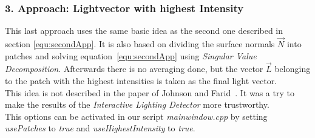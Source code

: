 \subsubsection{3. Approach: Lightvector with highest Intensity}\label{sec:appThree}
This last approach uses the same basic idea as the second one described in section \ref{equ:secondApp}. It is also based on dividing the surface normals $\vec{N}$ into patches and solving equation~\ref{equ:secondApp} using \textit{Singular Value Decomposition}. Afterwards there is no averaging done, but the vector $\vec{L}$ belonging to the patch with the highest intensities is taken as the final light vector. \\
This idea is not described in the paper of Johnson and Farid~\cite{Johnson}. It was a try to make the results of the \textit{Interactive Lighting Detector} more trustworthy. \\
This options can be activated in our script \textit{mainwindow.cpp} by setting \textit{usePatches} to \textit{true} and \textit{useHighestIntensity} to \textit{true}.

\newpage